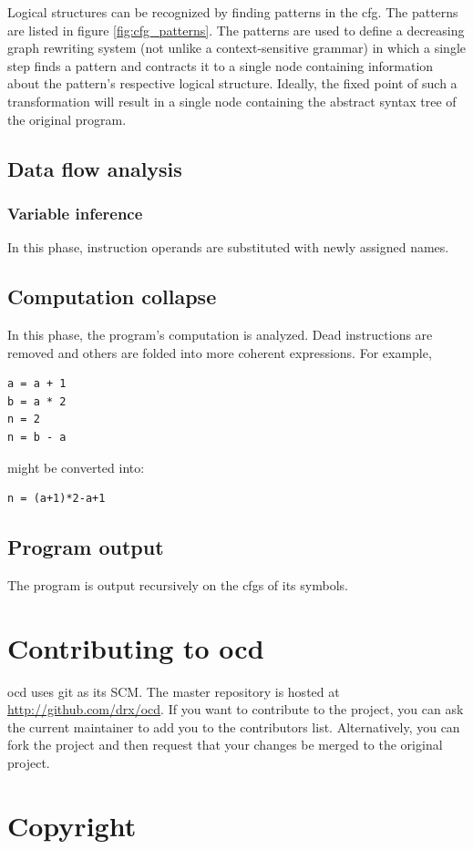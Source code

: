 \documentclass[leqno,11pt]{article}
\begin{document}
Logical structures can be recognized by finding patterns in the cfg. The patterns are listed in figure \ref{fig:cfg_patterns}. The patterns are used to define a decreasing graph rewriting system (not unlike a context-sensitive grammar) in which a single step finds a pattern and contracts it to a single node containing information about the pattern's respective logical structure. Ideally, the fixed point of such a transformation will result in a single node containing the abstract syntax tree of the original program.

\subsection{Data flow analysis}

\subsubsection{Variable inference}

In this phase, instruction operands are substituted with newly assigned names.

\subsection{Computation collapse}

In this phase, the program's computation is analyzed. Dead instructions are removed and others are folded into more coherent expressions. For example,

\begin{verbatim}
a = a + 1
b = a * 2
n = 2
n = b - a
\end{verbatim}

might be converted into:

\begin{verbatim}
n = (a+1)*2-a+1
\end{verbatim}

\subsection{Program output}

The program is output recursively on the cfgs of its symbols.

\section{Contributing to ocd}

ocd uses git as its SCM. The master repository is hosted at \url{http://github.com/drx/ocd}. If you want to contribute to the project, you can ask the current maintainer to add you to the contributors list. Alternatively, you can fork the project and then request that your changes be merged to the original project.

\section{Copyright}


\end{document}
